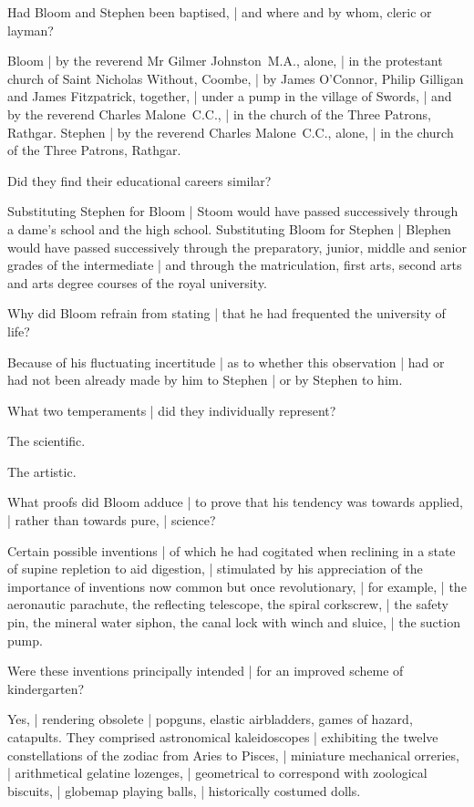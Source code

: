 Had Bloom and Stephen been baptised, |
and where and by whom,
cleric or layman?

\Religious
Bloom
 |
by the reverend Mr Gilmer Johnston~M.A., alone, |
in the protestant church of Saint Nicholas Without, Coombe, |
by James O'Connor, Philip Gilligan and James Fitzpatrick, together, |
under a pump in the village of Swords, |
and by the reverend Charles Malone~C.C., |
in the church of the Three Patrons, Rathgar.
Stephen
 |
by the reverend Charles Malone~C.C., alone, |
in the church of the Three Patrons, Rathgar.


Did they find their educational careers similar?

\Factual
Substituting Stephen for Bloom |
Stoom would have passed successively through a dame's school and the high school.
Substituting Bloom for Stephen |
Blephen would have passed successively
through the preparatory, junior, middle and senior grades of the intermediate |
and through the matriculation, first arts, second arts and arts degree courses
of the royal university.


Why did Bloom refrain from stating |
that he had frequented the university of life?

\Memories
Because of his fluctuating incertitude |
as to whether this observation |
had or had not been already made by him to Stephen |
or by Stephen to him.


What two temperaments |
did they individually represent?

\Bloom
The scientific.

\Stephen
The artistic.


What proofs did Bloom adduce |
to prove that his tendency was towards applied, |
rather than towards pure, |
science?

\Science
Certain possible inventions |
of which he had cogitated when reclining
in a state of supine repletion to aid digestion, |
stimulated by his appreciation of the importance
of inventions now common but once revolutionary, |
for example, |
the aeronautic parachute,
the reflecting telescope,
the spiral corkscrew,  |
the safety pin,
the mineral water siphon,
the canal lock with winch and sluice, |
the suction pump.


Were these inventions principally intended |
for an improved scheme of kindergarten?%

\Science
Yes, |
rendering obsolete |
popguns, elastic airbladders, games of hazard, catapults.
They comprised astronomical kaleidoscopes |
exhibiting the twelve constellations of the zodiac from Aries to Pisces, |
miniature mechanical orreries, |
arithmetical gelatine lozenges, |
geometrical to correspond with zoological biscuits, |
globemap playing balls, |
historically costumed dolls.


